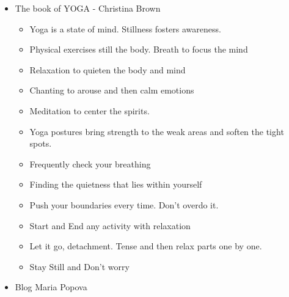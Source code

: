 \begin{itemize}
\item The book of YOGA - Christina Brown
	\begin{itemize}
	\item Yoga is a state of mind. Stillness fosters awareness.
	\item Physical exercises still the body. Breath to focus the mind
	\item Relaxation to quieten the body and mind
	\item Chanting to arouse and then calm emotions
	\item Meditation to center the spirits.
	\item Yoga postures bring strength to the weak areas and soften the tight spots.
	\item Frequently check your breathing
	\item Finding the quietness that lies within yourself
	\item Push your boundaries every time. Don't overdo it.
	\item Start and End any activity with relaxation
	\item Let it go, detachment. Tense and then relax parts one by one.
	\item Stay Still and Don't worry
	\end{itemize}
\item Blog Maria Popova

\end{itemize}
